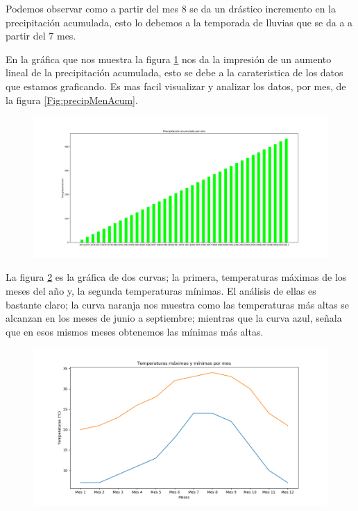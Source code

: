 \documentclass[12pt,a4paper]{article}
\begin{document}
\noindent Podemos observar como a partir del mes 8 se da un drástico incremento en la precipitación acumulada, esto lo debemos a la temporada de lluvias que se da a a partir del 7 mes. 

\noindent En la gráfica que nos muestra la figura \ref{Fig:PrecipAnuaAcum} nos da la impresión de un aumento lineal de la precipitación acumulada, esto se debe a la carateristica de los datos que estamos graficando. Es mas facil visualizar  y analizar los datos, por mes, de la figura \ref{Fig:precipMenAcum}.


\begin{figure}[H]
\centering
\includegraphics[scale=0.35]{PrecipAcum_ano.png}\caption{}
\label{Fig:PrecipAnuaAcum}
\end{figure}

La figura \ref{Fig:Tmaxminpmes} es la gráfica de dos curvas; la primera, temperaturas máximas de los meses del año y, la segunda temperaturas mínimas. El análisis de ellas es bastante claro; la curva naranja nos muestra como las temperaturas más altas se alcanzan en los meses de junio a septiembre; mientras que la curva azul, señala que en esos mismos meses obtenemos las mínimas más altas.  


\begin{figure}[H]
\centering
\includegraphics[scale=0.55]{Temp_max_min_mes.png} 
\caption{}
\label{Fig:Tmaxminpmes}
\end{figure}
\end{document}
